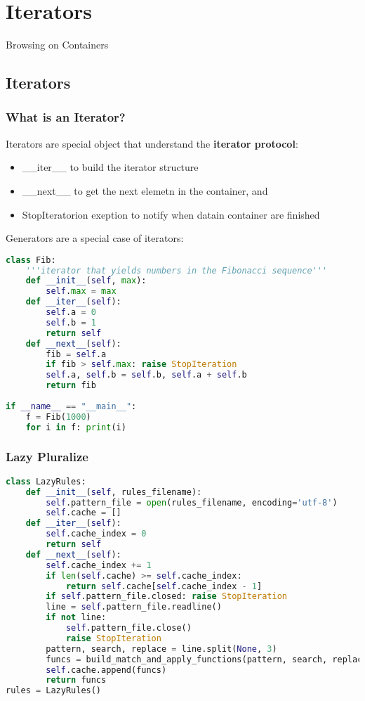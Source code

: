 \section{Iterators}

Browsing on Containers

\subsection{Iterators}

\subsubsection{What is an Iterator?}

Iterators are special object that understand the \textbf{iterator protocol}:

\begin{itemize}
	\item \_\_iter\_\_ to build the iterator structure
	\item \_\_next\_\_ to get the next elemetn in the container, and
	\item StopIteratorion exeption to notify when datain container are finished
\end{itemize}

Generators are a special case of iterators:

\begin{lstlisting}[language=Python]
class Fib:
	'''iterator that yields numbers in the Fibonacci sequence'''
	def __init__(self, max):
		self.max = max
	def __iter__(self):
		self.a = 0
		self.b = 1
		return self
	def __next__(self):
		fib = self.a
		if fib > self.max: raise StopIteration
		self.a, self.b = self.b, self.a + self.b
		return fib
		
if __name__ == "__main__":
	f = Fib(1000)
	for i in f: print(i)
\end{lstlisting}

\subsubsection{Lazy Pluralize}

\begin{lstlisting}[language=Python]
class LazyRules:
	def __init__(self, rules_filename):
		self.pattern_file = open(rules_filename, encoding='utf-8')
		self.cache = []
	def __iter__(self):
		self.cache_index = 0
		return self
	def __next__(self):
		self.cache_index += 1
		if len(self.cache) >= self.cache_index:
			return self.cache[self.cache_index - 1]
		if self.pattern_file.closed: raise StopIteration
		line = self.pattern_file.readline()
		if not line:
			self.pattern_file.close()
			raise StopIteration
		pattern, search, replace = line.split(None, 3)
		funcs = build_match_and_apply_functions(pattern, search, replace)
		self.cache.append(funcs)
		return funcs
rules = LazyRules()
\end{lstlisting}

